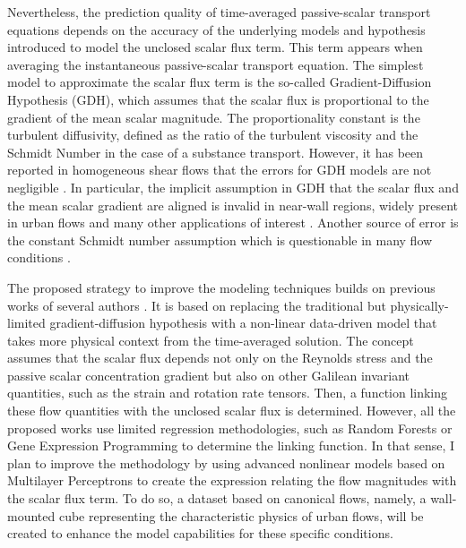 \documentclass{article}
\begin{document}
Nevertheless, the prediction quality of time-averaged passive-scalar transport equations depends on the accuracy of the underlying models and hypothesis introduced to model the unclosed scalar flux term. This term appears when averaging the instantaneous passive-scalar transport equation. The simplest model to approximate the scalar flux term is the so-called Gradient-Diffusion Hypothesis (GDH), which assumes that the scalar flux is proportional to the gradient of the mean scalar magnitude. The proportionality constant is the turbulent diffusivity, defined as the ratio of the turbulent viscosity and the Schmidt Number in the case of a substance transport. However, it has been reported in homogeneous shear flows that the errors for GDH models are not negligible \cite{TAV81}. In particular, the implicit assumption in GDH that the scalar flux and the mean scalar gradient are aligned is invalid in near-wall regions, widely present in urban flows and many other applications of interest \cite{WEA20}. Another source of error is the constant Schmidt number assumption which is questionable in many flow conditions \cite{WEA20}. 

The proposed strategy to improve the modeling techniques builds on previous works of several authors \cite{MIL18,WEA20}. It is based on replacing the traditional but physically-limited gradient-diffusion hypothesis with a non-linear data-driven model that takes more physical context from the time-averaged solution. The concept assumes that the scalar flux depends not only on the Reynolds stress and the passive scalar concentration gradient but also on other Galilean invariant quantities, such as the strain and rotation rate tensors. Then, a function linking these flow quantities with the unclosed scalar flux is determined. However, all the proposed works use limited regression methodologies, such as Random Forests or Gene Expression Programming to determine the linking function. In that sense, I plan to improve the methodology by using advanced nonlinear models based on Multilayer Perceptrons to create the expression relating the flow magnitudes with the scalar flux term. To do so, a dataset based on canonical flows, namely, a wall-mounted cube representing the characteristic physics of urban flows, will be created to enhance the model capabilities for these specific conditions.
\end{document}
